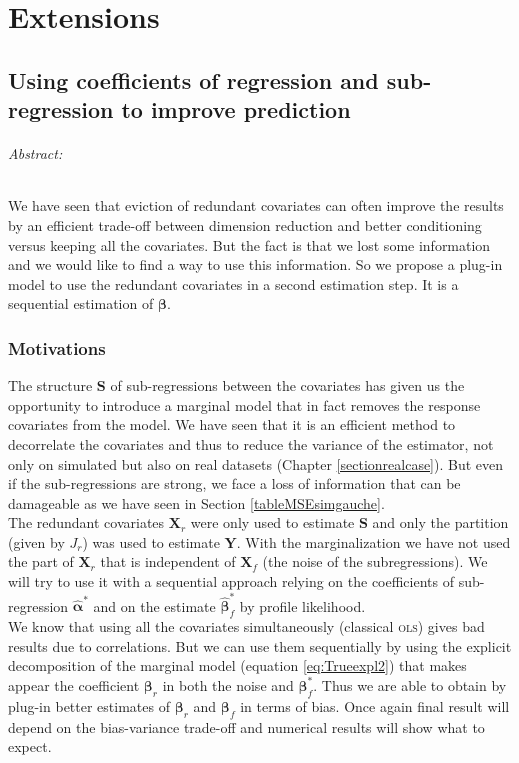 \documentclass[12pt,a4paper]{report}
\begin{document}
\part{Extensions}	
			
		
\chapter{Using coefficients of regression and sub-regression to improve prediction}\label{chapplugin}
	\paragraph{Abstract:} We have seen that eviction of redundant covariates can often improve the results by an efficient trade-off between dimension reduction and better conditioning versus keeping all the covariates. But the fact is that we lost some information and we would like to find a way to use this information. So we propose a plug-in model to use the redundant covariates in a second estimation step. It is a sequential estimation of $\boldsymbol{\beta}$.
	\section{Motivations}
		The structure $\boldsymbol{S}$ of sub-regressions between the covariates has given us the opportunity to introduce a marginal model that in fact removes the response covariates from the model. We have seen that it is an efficient method to decorrelate the covariates and thus to reduce the variance of the estimator, not only on simulated but also on real datasets (Chapter \ref{sectionrealcase}). But even if the sub-regressions are strong, we face a loss of information that can be damageable as we have seen in Section \ref{tableMSEsimgauche}. \\
		
		The redundant covariates $\boldsymbol{X}_r$ were only used to estimate $\boldsymbol{S}$ and only the partition (given by $J_r$) was used to estimate $\boldsymbol{Y}$. With the marginalization we have not used the part of $\boldsymbol{X}_r$ that is independent of $\boldsymbol{X}_f$ (the noise of the subregressions). We will try to use it with a sequential approach relying on the coefficients of sub-regression $\hat{\boldsymbol{\alpha}}^*$ and on the estimate $\hat{\boldsymbol{\beta}}_f^*$ by profile likelihood.\\
		
		We know that using all the covariates simultaneously (classical \textsc{ols}) gives bad results due to correlations. But we can use them sequentially by using the explicit decomposition of the marginal model (equation \ref{eq:Trueexpl2}) that makes appear the coefficient $\boldsymbol{\beta}_r$ in both the noise and $\boldsymbol{\beta}_f^*$. Thus we are able to obtain by plug-in better estimates of $\boldsymbol{\beta}_r$ and $\boldsymbol{\beta}_f$ in terms of bias. Once again final result will depend on the bias-variance trade-off and numerical results will show what to expect.\\
		
\end{document}

